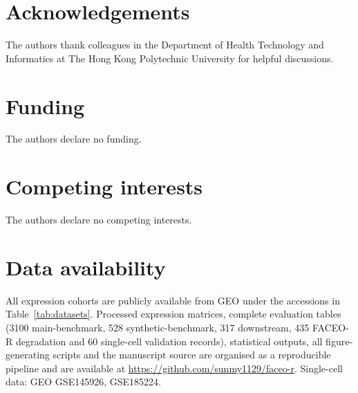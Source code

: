 \documentclass[twocolumn,10pt,letterpaper]{article}
\begin{document}
\section*{Acknowledgements}

The authors thank colleagues in the Department of Health Technology and Informatics at The
Hong Kong Polytechnic University for helpful discussions.

\section*{Funding}

The authors declare no funding.

\section*{Competing interests}

The authors declare no competing interests.

\section*{Data availability}
All expression cohorts are publicly available from GEO under the accessions in
Table~\ref{tab:datasets}. Processed expression matrices, complete evaluation tables (3100
main-benchmark, 528 synthetic-benchmark, 317 downstream, 435 FACEO-R degradation and 60
single-cell validation records), statistical outputs, all figure-generating scripts and the
manuscript source are organised as a reproducible pipeline and are available at
\url{https://github.com/sunmy1129/faceo-r}. Single-cell data: GEO GSE145926, GSE185224.
\end{document}
